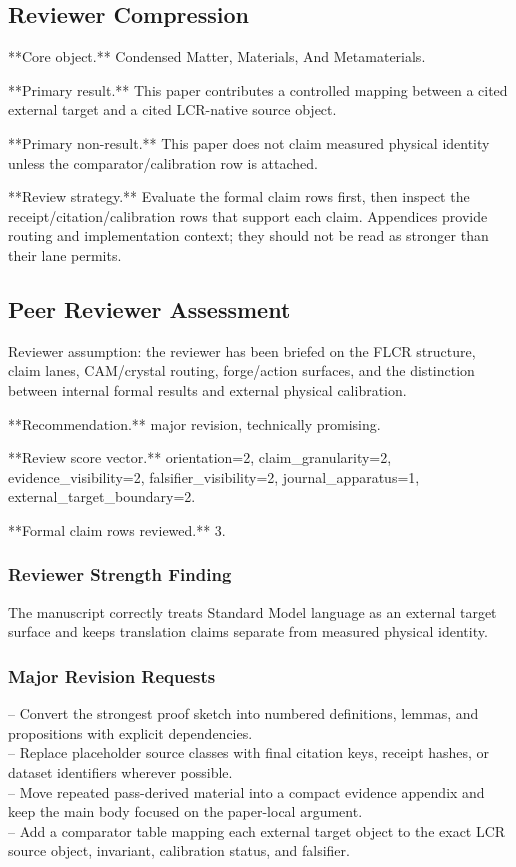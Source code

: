 \documentclass[11pt]{article}
\begin{document}
\subsection*{Reviewer Compression}

**Core object.** Condensed Matter, Materials, And Metamaterials.

**Primary result.** This paper contributes a controlled mapping between a cited external target and a cited LCR-native source object.

**Primary non-result.** This paper does not claim measured physical identity unless the comparator/calibration row is attached.

**Review strategy.** Evaluate the formal claim rows first, then inspect the receipt/citation/calibration rows that support each claim. Appendices provide routing and implementation context; they should not be read as stronger than their lane permits.

\subsection*{Peer Reviewer Assessment}

Reviewer assumption: the reviewer has been briefed on the FLCR structure, claim lanes, CAM/crystal routing, forge/action surfaces, and the distinction between internal formal results and external physical calibration.

**Recommendation.** major revision, technically promising.

**Review score vector.** orientation=2, claim\_granularity=2, evidence\_visibility=2, falsifier\_visibility=2, journal\_apparatus=1, external\_target\_boundary=2.

**Formal claim rows reviewed.** 3.

\subsubsection*{Reviewer Strength Finding}

The manuscript correctly treats Standard Model language as an external target surface and keeps translation claims separate from measured physical identity.

\subsubsection*{Major Revision Requests}

\noindent{}-- Convert the strongest proof sketch into numbered definitions, lemmas, and propositions with explicit dependencies.\\
\noindent{}-- Replace placeholder source classes with final citation keys, receipt hashes, or dataset identifiers wherever possible.\\
\noindent{}-- Move repeated pass-derived material into a compact evidence appendix and keep the main body focused on the paper-local argument.\\
\noindent{}-- Add a comparator table mapping each external target object to the exact LCR source object, invariant, calibration status, and falsifier.\\
\end{document}
